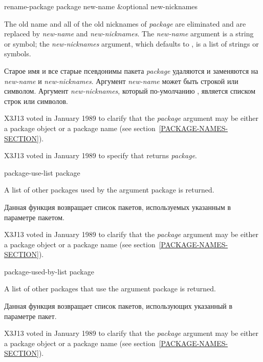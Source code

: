 \begin{defun}[Function]
rename-package package new-name &optional new-nicknames

The old name and all of the old nicknames of \emph{package} are eliminated
and are replaced by \emph{new-name} and \emph{new-nicknames}.  The
\emph{new-name} argument is a string or symbol; the \emph{new-nicknames}
argument, which defaults to {\false}, is a list of strings or symbols.

Старое имя и все старые псевдонимы пакета \emph{package} удаляются и заменяются
на \emph{new-name} и \emph{new-nicknames}. Аргумент \emph{new-name} может быть
строкой или символом. Аргумент \emph{new-nicknames}, который по-умолчанию
{\false}, является списком строк или символов.
\begin{new}
X3J13 voted in January 1989
to clarify that the \emph{package} argument may be either a package object
or a package name (see section~\ref{PACKAGE-NAMES-SECTION}).
\end{new}

\begin{new}
X3J13 voted in January 1989
to specify that  returns \emph{package}.
\end{new}
\end{defun}

\begin{defun}[Function]
package-use-list package

A list of other packages used by the argument package is returned.

Данная функция возвращает список пакетов, используемых указанным в параметре пакетом.
\begin{new}
X3J13 voted in January 1989
to clarify that the \emph{package} argument may be either a package object
or a package name (see section~\ref{PACKAGE-NAMES-SECTION}).
\end{new}
\end{defun}

\begin{defun}[Function]
package-used-by-list package

A list of other packages that use the argument package is returned.

Данная функция возвращает список пакетов, использующих указанный в параметре пакет.
\begin{new}
X3J13 voted in January 1989
to clarify that the \emph{package} argument may be either a package object
or a package name (see section~\ref{PACKAGE-NAMES-SECTION}).
\end{new}
\end{defun}

